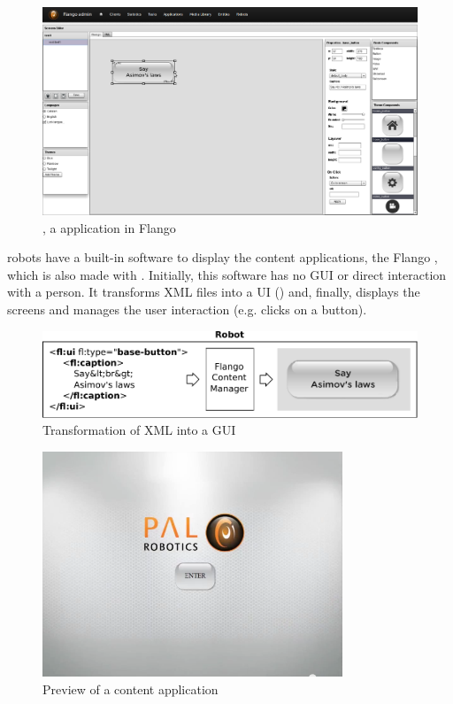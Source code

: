 \begin{figure}[htb]
    \centering
    \includegraphics[width=\textwidth]{figures/screens-editor}
    \caption{\se , a \flash application in Flango}
    \label{fig:screens-editor}
\end{figure}

 robots have a built-in software to display the content applications, the Flango \cm , which is also made with \flash .
Initially, this software has no \ac{GUI} or direct interaction with a person.
It transforms \ac{XML} files into a \ac{UI} () and, finally, displays the screens and manages the user interaction (e.g. clicks on a button).

\begin{figure}[htb]
    \centering
    \includegraphics[width=\textwidth]{figures/xml-flango-screenshot}
    \caption{Transformation of \acs{XML} into a \acs{GUI}}
    \label{fig:xml-flango-view}
\end{figure}

\begin{figure}[htb]
    \centering
    \includegraphics[width=0.8\textwidth]{figures/demo-app-preview}
    \caption{Preview of a content application}
    \label{fig:demo-app-preview}
\end{figure}

